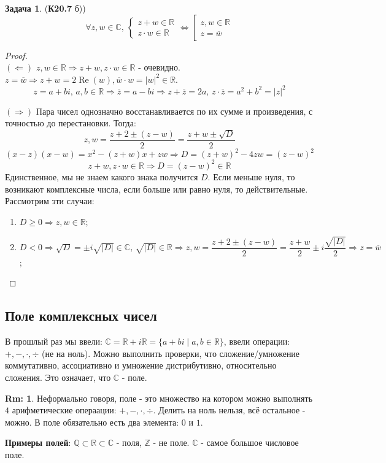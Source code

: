 \documentclass[12pt]{article}
\newcommand{\MR}{\mathbb{R}}
\newcommand{\MC}{\mathbb{C}}
\newcommand{\MQ}{\mathbb{Q}}
\newcommand{\MZ}{\mathbb{Z}}
\theoremstyle{definition}
\newtheorem{rem}{Rm:}
\newtheorem{problem}{Задача}
\newcommand{\ovl}[1]{\overline{#1}}
\DeclareMathOperator{\RE}{\operatorname{Re}}
\begin{document}
\begin{problem}(\textbf{К20.7} б))
 	$$
		\forall z,w \in \MC, \, 
		\begin{cases}
			z + w \in \MR\\
			z{\cdot}w \in \MR
		\end{cases} \Leftrightarrow
		\left[
			\begin{array}{l}
				z,w \in \MR \\
				z = \ovl{w}
			\end{array}
		\right.
	$$
\end{problem}
\begin{proof}\hfill\\
	$(\Leftarrow)$ $z,w \in \MR \Rightarrow z + w, z{\cdot}w \in \MR$ - очевидно. $z = \ovl{w} \Rightarrow z + w = 2\RE(w), \ovl{w}{\cdot}w = |w|^2 \in \MR$.
	$$
		z = a + bi,\, a,b \in \MR \Rightarrow \ovl{z} = a - bi \Rightarrow z + \ovl{z} = 2a, \, z{\cdot}\ovl{z} = a^2 + b^2 = |z|^2
	$$
	
	$(\Rightarrow)$ Пара чисел однозначно восстанавливается по их сумме и произведения, с точностью до перестановки. Тогда:
	$$
		z, w = \dfrac{z + 2 \pm(z- w)}{2} = \dfrac{z + w \pm \sqrt{D}}{2}
	$$
	$$
		(x - z)(x - w) = x^2 - (z + w)x + zw \Rightarrow D = (z + w)^2 - 4zw = (z - w)^2 
	$$
	$$
		z + w, z{\cdot}w \in \MR \Rightarrow D = (z -w)^2 \in \MR
	$$
	Единственное, мы не знаем какого знака получится $D$. Если меньше нуля, то возникают комплексные числа, если больше или равно нуля, то действительные. Рассмотрим эти случаи:
	\begin{enumerate}[label=\arabic*)]
		\item $D \geq 0 \Rightarrow z,w \in \MR$;
		\item $D < 0 \Rightarrow \sqrt{D} = \pm i\sqrt{|D|} \in \MC, \, \sqrt{|D|} \in \MR \Rightarrow z, w = \dfrac{z + 2 \pm(z- w)}{2} = \dfrac{z + w}{2} \pm i\dfrac{\sqrt{|D|}}{2} \Rightarrow z = \ovl{w}$;
	\end{enumerate}
\end{proof}

\subsection*{Поле комплексных чисел}
В прошлый раз мы ввели: $\MC = \MR + i \MR = \{a + bi \mid a,b\in \MR\}$, ввели операции: $+, -, \cdot, \div$ (не на ноль). Можно выполнить проверки, что сложение/умножение коммутативно, ассоциативно и умножение дистрибутивно, относительно сложения. Это означает, что $\MC$ - поле.
\begin{rem}
	Неформально говоря, поле - это множество на котором можно выполнять $4$ арифметические операации: $+, -, \cdot, \div$. Делить на ноль нельзя, всё остальное - можно. В поле обязательно есть два элемента: $0$ и $1$.
\end{rem}
\textbf{Примеры полей}: $\MQ \subset \MR \subset \MC$ - поля, $\MZ$ - не поле.  $\MC$ - самое большое числовое поле.
	
\end{document}
